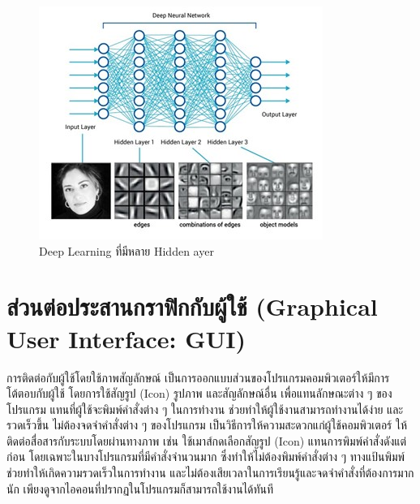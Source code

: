 \begin{figure}[!ht]
  \begin{center}
    \includegraphics[scale=.9]{pic/deep2.jpg}
    \caption[Deep Learning ที่มีหลาย Hidden ayer]{Deep Learning ที่มีหลาย Hidden ayer}
    \label{fig:deep2}
  \end{center}
\end{figure}

\section{ส่วนต่อประสานกราฟิกกับผู้ใช้ (Graphical User Interface: GUI)}
การติดต่อกับผู้ใช้โดยใช้ภาพสัญลักษณ์ เป็นการออกแบบส่วนของโปรแกรมคอมพิวเตอร์ให้มีการโต้ตอบกับผู้ใช้ โดยการใช้สัญรูป (Icon) รูปภาพ และสัญลักษณ์อื่น 
เพื่อแทนลักษณะต่าง ๆ ของโปรแกรม แทนที่ผู้ใช้จะพิมพ์คำสั่งต่าง ๆ ในการทำงาน ช่วยทำให้ผู้ใช้งานสามารถทำงานได้ง่าย และรวดเร็วขึ้น ไม่ต้องจดจำคำสั่งต่าง ๆ 
ของโปรแกรม เป็นวิธีการให้ความสะดวกแก่ผู้ใช้คอมพิวเตอร์ ให้ติดต่อสื่อสารกับระบบโดยผ่านทางภาพ เช่น ใช้เมาส์กดเลือกสัญรูป (Icon) แทนการพิมพ์คำสั่งดังแต่ก่อน 
โดยเฉพาะในบางโปรแกรมที่มีคำสั่งจำนวนมาก ซึ่งทำให้ไม่ต้องพิมพ์คำสั่งต่าง ๆ ทางแป้นพิมพ์ ช่วยทำให้เกิดความรวดเร็วในการทำงาน 
และไม่ต้องเสียเวลาในการเรียนรู้และจดจำคำสั่งที่ต้องการมากนัก เพียงดูจากไอคอนที่ปรากฏในโปรแกรมก็สามารถใช้งานได้ทันที \cite{GUI}

